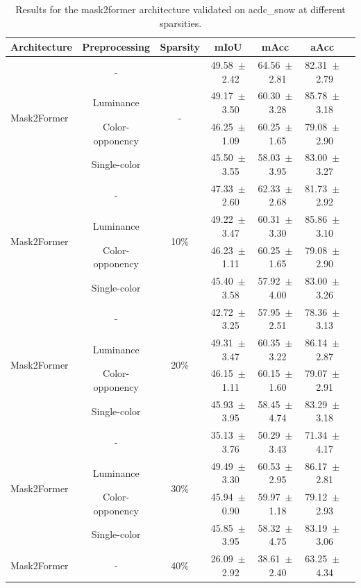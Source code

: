 \begin{table}[h]
\centering
\caption{Results for the mask2former architecture validated on acdc_snow at different sparsities.}
\begin{tabular}{@{}lccc ccc@{}}
\toprule
Architecture & Preprocessing & Sparsity & mIoU & mAcc & aAcc \\
\midrule

\multirow{4}{*}{Mask2Former} & - & \multirow{4}{*}{-} & 49.58~$\pm$~2.42 & 64.56~$\pm$~2.81 & 82.31~$\pm$~2.79 \\
& Luminance & & 49.17~$\pm$~3.50 & 60.30~$\pm$~3.28 & 85.78~$\pm$~3.18 \\
& Color-opponency & & 46.25~$\pm$~1.09 & 60.25~$\pm$~1.65 & 79.08~$\pm$~2.90 \\
& Single-color & & 45.50~$\pm$~3.55 & 58.03~$\pm$~3.95 & 83.00~$\pm$~3.27 \\
\midrule
\multirow{4}{*}{Mask2Former} & - & \multirow{4}{*}{10\%} & 47.33~$\pm$~2.60 & 62.33~$\pm$~2.68 & 81.73~$\pm$~2.92 \\
& Luminance & & 49.22~$\pm$~3.47 & 60.31~$\pm$~3.30 & 85.86~$\pm$~3.10 \\
& Color-opponency & & 46.23~$\pm$~1.11 & 60.25~$\pm$~1.65 & 79.08~$\pm$~2.90 \\
& Single-color & & 45.40~$\pm$~3.58 & 57.92~$\pm$~4.00 & 83.00~$\pm$~3.26 \\
\midrule
\multirow{4}{*}{Mask2Former} & - & \multirow{4}{*}{20\%} & 42.72~$\pm$~3.25 & 57.95~$\pm$~2.51 & 78.36~$\pm$~3.13 \\
& Luminance & & 49.31~$\pm$~3.47 & 60.35~$\pm$~3.22 & 86.14~$\pm$~2.87 \\
& Color-opponency & & 46.15~$\pm$~1.11 & 60.15~$\pm$~1.60 & 79.07~$\pm$~2.91 \\
& Single-color & & 45.93~$\pm$~3.95 & 58.45~$\pm$~4.74 & 83.29~$\pm$~3.18 \\
\midrule
\multirow{4}{*}{Mask2Former} & - & \multirow{4}{*}{30\%} & 35.13~$\pm$~3.76 & 50.29~$\pm$~3.43 & 71.34~$\pm$~4.17 \\
& Luminance & & 49.49~$\pm$~3.30 & 60.53~$\pm$~2.95 & 86.17~$\pm$~2.81 \\
& Color-opponency & & 45.94~$\pm$~0.90 & 59.97~$\pm$~1.18 & 79.12~$\pm$~2.93 \\
& Single-color & & 45.85~$\pm$~3.95 & 58.32~$\pm$~4.75 & 83.19~$\pm$~3.06 \\
\midrule
\multirow{4}{*}{Mask2Former} & - & \multirow{4}{*}{40\%} & 26.09~$\pm$~2.92 & 38.61~$\pm$~2.40 & 63.25~$\pm$~4.34 \\

\end{tabular}
\end{table}
